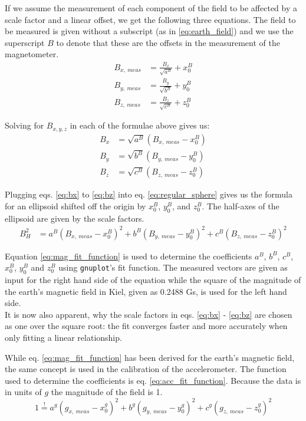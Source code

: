 If we assume the measurement of each component of the field to be affected by a scale factor and a linear offset, we get the following three equations. The field to be measured is given without a subscript (as in \eqref{eq:earth_field}) and we use the superscript $B$ to denote that these are the offsets in the measurement of the magnetometer.
\begin{align}
    B_{x,\ meas} &= \frac{B_x}{\sqrt{a^B}}+x_0^B \\
    B_{y,\ meas} &= \frac{B_y}{\sqrt{b^B}}+y_0^B \\
    B_{z,\ meas} &= \frac{B_z}{\sqrt{c^B}}+z_0^B
\end{align}

Solving for $B_{x,y,z}$ in each of the formulae above gives us:
\begin{align}
    B_x&=\sqrt{a^B}(B_{x,\ meas}-x_0^B) \label{eq:bx} \\
    B_y&=\sqrt{b^B}(B_{y,\ meas}-y_0^B) \label{eq:by} \\
    B_z&=\sqrt{c^B}(B_{z,\ meas}-z_0^B) \label{eq:bz}
\end{align}

Plugging eqs. \eqref{eq:bx} to \eqref{eq:bz} into eq. \eqref{eq:regular_sphere} gives us the formula for an ellipsoid shifted off the origin by $x_0^B$, $y_0^B$, and $z_0^B$. The half-axes of the ellipsoid are given by the scale factors.
\begin{align}
    B_{H}^2&=a^B(B_{x,\ meas}-x_0^B)^2 + b^B(B_{y,\ meas}-y_0^B)^2 + c^B(B_{z,\ meas}-z_0^B)^2 
    \label{eq:mag_fit_function}
\end{align}

 Equation \eqref{eq:mag_fit_function} is used to determine the coefficients $a^B$, $b^B$, $c^B$, $x_0^B$, $y_0^B$ and $z_0^B$ using \verb|gnuplot|'s fit function. The measured vectors are given as input for the right hand side of the equation while the square of the magnitude of the earth's magnetic field in Kiel, given as 0.2488 Gs, is used for the left hand side.\\
It is now also apparent, why the scale factors in eqs. \eqref{eq:bx} - \eqref{eq:bz} are chosen as one over the square root: the fit converges faster and more accurately when only fitting a linear relationship.

While eq. \eqref{eq:mag_fit_function} has been derived for the earth's magnetic field, the same concept is used in the calibration of the accelerometer. The function used to determine the coefficients is eq. \eqref{eq:acc_fit_function}. Because the data is in units of $g$ the magnitude of the field is 1.
\begin{equation}
    1\overset{!}{=}a^g(g_{x,\ meas}-x_0^g)^2 + b^g(g_{y,\ meas}-y_0^g)^2 + c^g(g_{z,\ meas}-z_0^g)^2
    \label{eq:acc_fit_function}
\end{equation}

